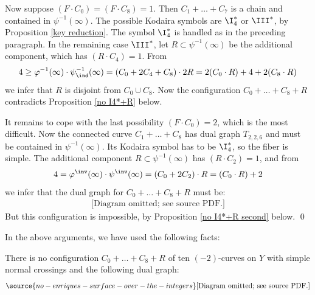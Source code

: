 Now suppose $(F\cdot C_0)=(F\cdot C_8)=1$. Then $C_1+\ldots +C_7$ is a chain and contained in $\psi^{-1}(\infty)$.
The possible Kodaira symbols are $\I_4^*$ or $\III^*$, by Proposition \ref{key reduction}.
The symbol $\I_4^*$ is handled as in the preceding paragraph. In the remaining case $\III^*$, let $R\subset \psi^{-1}(\infty)$ be the
additional component, which has $(R\cdot C_4)=1$. From
$$
4\geq \varphi^{-1}(\infty)\cdot \psi^{-1}_\ind(\infty) = (C_0+2C_4+C_8)\cdot 2R = 2(C_0\cdot R) + 4 + 2(C_8\cdot R)
$$
we infer that $R$ is disjoint from $C_0\cup C_8$. Now the configuration $C_0+\ldots+C_8+R$ contradicts Proposition \ref{no I4*+R} below.

It remains to cope with the last possibility   $(F\cdot C_0)=2$, which is the most difficult.
Now the connected curve $C_1+\ldots+C_8$ has dual graph $T_{2,2,6}$
and must be contained in $\psi^{-1}(\infty)$. Its Kodaira symbol has to be $\I_4^*$, so the fiber is simple. The additional
component $R\subset\psi^{-1}(\infty)$ has $(R\cdot C_2)=1$, and from
$$
4=\varphi^\inv(\infty)\cdot \psi^\inv(\infty) = (C_0+2C_2)\cdot R = (C_0\cdot R) + 2
$$
we infer that the dual graph for $C_0+\ldots+C_8+R$ must be:
\begin{equation*}
\begin{gathered}
\text{[Diagram omitted; see source PDF.]}
\end{gathered}
\end{equation*}
But this configuration is impossible, by Proposition \ref{no I4*+R second} below.
\qed


In the above arguments, we have used the following facts:

\begin{proposition}
\notready
\label{no I4*+R}
There is no configuration $C_0+\ldots+C_8+R$ of ten $(-2)$-curves on $Y$ with simple normal crossings and the following dual graph:
\begin{equation}
\label{I4*+R}
\source{no-enriques-surface-over-the-integers}
\begin{gathered}
\text{[Diagram omitted; see source PDF.]}
\end{gathered}
\end{equation}
\end{proposition}


